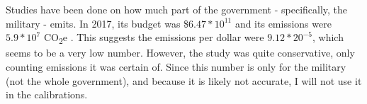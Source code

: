 \documentclass[letter, 12pt, epsf,leqno]{article}
\begin{document}
\begin{itemize}
Studies have been done on how much part of the government - specifically, the military - emits.  In 2017, its budget was \$$6.47 * 10^{11}$ \citep{macrotrends_military} and its emissions were $5.9 * 10^7$ CO\textsubscript{2}e \citep{reuters}.  This suggests the emissions per dollar were $9.12 * 20^{-5}$, which seems to be a very low number.  However, the study was quite conservative, only counting emissions it was certain of.  Since this number is only for the military (not the whole government), and because it is likely not accurate, I will not use it in the calibrations. %
\end{itemize}
\end{document}
